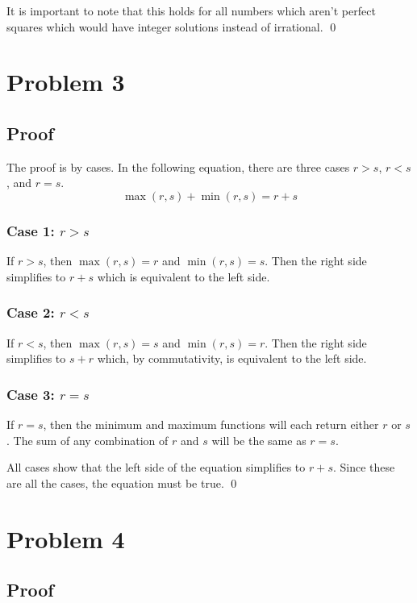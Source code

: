\documentclass{article}
\begin{document}
It is important to note that this holds for all numbers which aren't perfect
squares which would have integer solutions instead of irrational. \qed

\section*{Problem 3}

\subsection*{Proof}

The proof is by cases. In the following equation, there are three cases $r > s$,
$r < s$, and $r = s$.
$$ \max(r, s) + \min(r, s) = r + s $$

\subsubsection*{Case 1: $r > s$}

If $r > s$, then $\max(r, s) = r$ and $\min(r, s) = s$. Then the right side
simplifies to $r + s$ which is equivalent to the left side.

\subsubsection*{Case 2: $r < s$}

If $r < s$, then $\max(r, s) = s$ and $\min(r, s) = r$. Then the right side
simplifies to $s + r$ which, by commutativity, is equivalent to the left side.

\subsubsection*{Case 3: $r = s$}

If $r = s$, then the minimum and maximum functions will each return either $r$
or $s$. The sum of any combination of $r$ and $s$ will be the same as $r = s$.

\bigbreak

All cases show that the left side of the equation simplifies to $r + s$. Since
these are all the cases, the equation must be true. \qed

\section*{Problem 4}

\subsection*{Proof}
\end{document}
